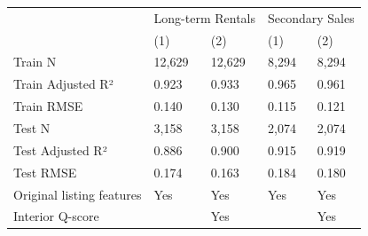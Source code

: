 \begin{tabular}{lllll}
\toprule
 & \multicolumn{2}{r}{Long-term Rentals} & \multicolumn{2}{r}{Secondary Sales} \\
 & (1) & (2) & (1) & (2) \\
\midrule
Train N & 12,629 & 12,629 & 8,294 & 8,294 \\
Train Adjusted R² & 0.923 & 0.933 & 0.965 & 0.961 \\
Train RMSE & 0.140 & 0.130 & 0.115 & 0.121 \\
Test N & 3,158 & 3,158 & 2,074 & 2,074 \\
Test Adjusted R² & 0.886 & 0.900 & 0.915 & 0.919 \\
Test RMSE & 0.174 & 0.163 & 0.184 & 0.180 \\
Original listing features & Yes & Yes & Yes & Yes \\
Interior Q-score &  & Yes &  & Yes \\
\bottomrule
\end{tabular}
